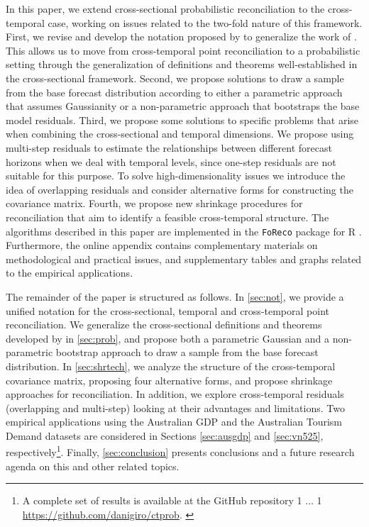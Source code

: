 \documentclass[a4paper,11pt]{article}
\newcommand{\blind}{1}
\newcommand{\githuburl}{\begingroup%
\if0\blind
{
$\dots$
}\fi
\if1\blind
{
\url{https://github.com/danigiro/ctprob}.
}\fi
\endgroup}
\theoremstyle{definition}
\begin{document}
In this paper, we extend cross-sectional probabilistic reconciliation to the cross-temporal case, working on issues related to the two-fold nature of this framework. First, we revise and develop the notation proposed by \cite{difonzo2023} to generalize the work of \cite{panagiotelis2023}. This allows us to move from cross-temporal point reconciliation to a probabilistic setting through the generalization of definitions and theorems well-established in the cross-sectional framework. Second, we propose solutions to draw a sample from the base forecast distribution according to either a parametric approach that assumes Gaussianity or a non-parametric approach that bootstraps the base model residuals. Third, we propose some solutions to specific problems that arise when combining the cross-sectional and temporal dimensions. We propose using multi-step residuals to estimate the relationships between different forecast horizons when we deal with temporal levels, since one-step residuals are not suitable for this purpose. To solve high-dimensionality issues we introduce the idea of overlapping residuals and consider alternative forms for constructing the covariance matrix. Fourth, we propose new shrinkage procedures for reconciliation that aim to identify a feasible cross-temporal structure. The algorithms described in this paper are implemented in the \texttt{FoReco} package \citep{foreco2023} for R \citep{rcoreteam2022}. Furthermore, the online appendix contains complementary materials on methodological and practical issues, and supplementary tables and graphs related to the empirical applications.

The remainder of the paper is structured as follows. In \autoref{sec:not}, we provide a unified notation for the cross-sectional, temporal and cross-temporal point reconciliation. We generalize the cross-sectional definitions and theorems developed by \cite{panagiotelis2023} in \autoref{sec:prob}, and propose both a parametric Gaussian and a non-parametric bootstrap approach to draw a sample from the base forecast distribution. In \autoref{sec:shrtech}, we analyze the structure of the cross-temporal covariance matrix, proposing four alternative forms, and propose shrinkage approaches for reconciliation. In addition, we explore cross-temporal residuals (overlapping and multi-step) looking at their advantages and limitations. %
Two empirical applications using the Australian GDP and the Australian Tourism Demand datasets are considered in Sections \ref{sec:ausgdp} and \ref{sec:vn525}, respectively\footnote{A complete set of results is available at the GitHub repository \githuburl}. Finally, \autoref{sec:conclusion} presents conclusions and a future research agenda on this and other related topics.
\end{document}
